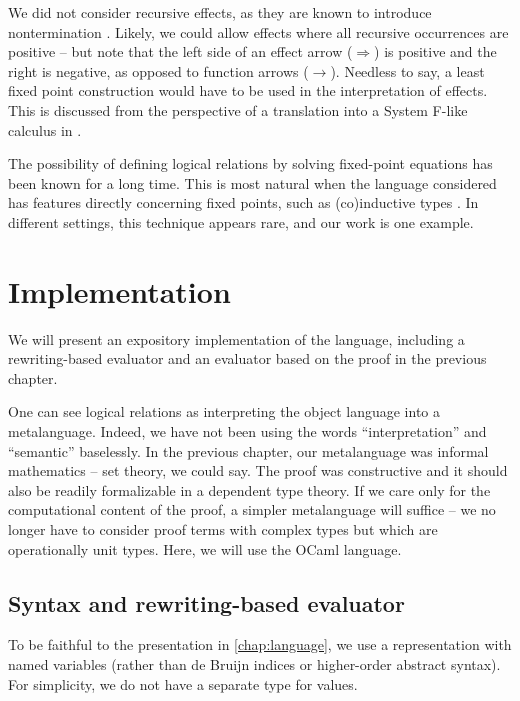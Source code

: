 \documentclass[a4paper, 11pt,titlepage, openright, twoside]{report}
\newcommand{\+}{\enspace}
\begin{document}
We did not consider recursive effects, as they are known to introduce nontermination \cite{hwc}.
Likely, we could allow effects where all recursive occurrences are positive
– but note that
the left side of an effect arrow ($\Rightarrow$) is positive and the right is negative,
as opposed to function arrows ($→$).
Needless to say, a least fixed point construction would have to be used in the interpretation of effects.
This is discussed from the perspective of a translation into a System F-like calculus in
\cite{xie2020effect}.

The possibility of defining logical relations by solving fixed-point equations
has been known for a long time.
This is most natural when the language considered has features directly
concerning fixed points, such as (co)inductive types \cite{altenkirch, operfl}.
In different settings, this technique appears rare, and our work is one example.


\chapter{Implementation}

We will present an expository implementation of the language,
including a rewriting-based evaluator and an evaluator based on the proof in the previous chapter.

One can see logical relations as interpreting the object language into a metalanguage.
Indeed, we have not been using the words ``interpretation'' and ``semantic'' baselessly.
In the previous chapter, our metalanguage was informal mathematics – set theory, we could say.
The proof was constructive and it should also be readily formalizable in a dependent type theory.
If we care only for the computational content of the proof, a simpler metalanguage will suffice –
we no longer have to consider proof terms with complex types but which are operationally unit types.
Here, we will use the OCaml language.

\section{Syntax and rewriting-based evaluator}

To be faithful to the presentation in \autoref{chap:language},
we use a representation with named variables (rather than de Bruijn indices
or higher-order abstract syntax).
For simplicity, we do not have a separate type for values.
\end{document}
